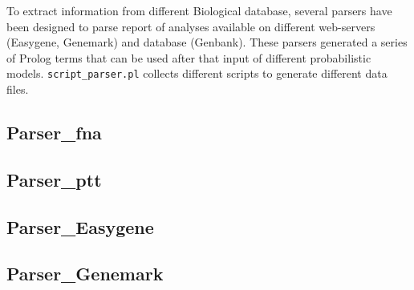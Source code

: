 \documentclass{book}
\begin{document}
To extract information from different Biological database, several parsers have been designed 
to parse report of analyses available on different web-servers (Easygene, Genemark) and 
database (Genbank). These parsers generated a series of Prolog terms that can be used after that
input of different probabilistic models. \texttt{script\_parser.pl} collects different scripts to generate
different data files.

\subsection{Parser\_fna}

\subsection{Parser\_ptt}

\subsection{Parser\_Easygene}

\subsection{Parser\_Genemark}



\printindex
\end{document}
